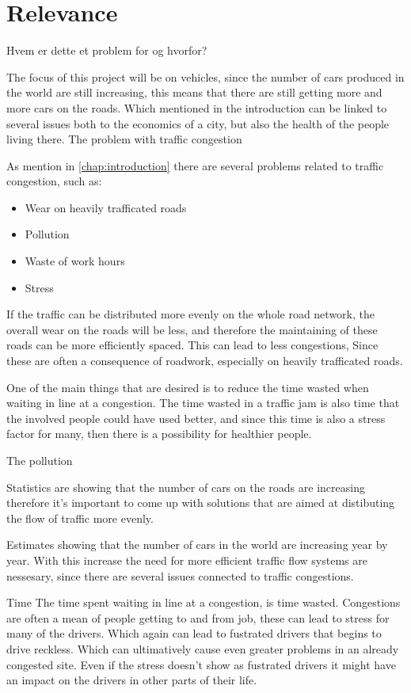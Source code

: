 \section{Relevance}
Hvem er dette et problem for og hvorfor?

The focus of this project will be on vehicles, since the number of cars produced in the world are still increasing, this means that there are still getting more and more cars on the roads. Which mentioned in the introduction can be linked to several issues both to the economics of a city, but also the health of the people living there.
The problem with traffic congestion 

As mention in \ref{chap:introduction} there are several problems related to traffic congestion, such as:
\begin{itemize}
	\item Wear on heavily trafficated roads
	\item Pollution
	\item Waste of work hours
	\item Stress
\end{itemize}

If the traffic can be distributed more evenly on the whole road network, the overall wear on the roads will be less, and therefore the maintaining of these roads can be more efficiently spaced. This can lead to less congestions, Since these are often a consequence of roadwork, especially on heavily trafficated roads.

One of the main things that are desired is to reduce the time wasted when waiting in line at a congestion.
The time wasted in a traffic jam is also time that the involved people could have used better, and since this time is also a stress factor for many, then there is a possibility for healthier people. 

The pollution 




Statistics are showing that the number of cars on the roads are increasing therefore it's important to come up with solutions that are aimed at distibuting the flow of traffic more evenly.

Estimates showing that the number of cars in the world are increasing year by year.\cite{http://wardsauto.com/ar/world_vehicle_population_110815} With this increase the need for more efficient traffic flow systems are nessesary, since there are several issues connected to traffic congestions.

Time
The time spent waiting in line at a congestion, is time wasted. Congestions are often a mean of people getting to and from job, these can lead to stress for many of the drivers.\cite{stress,http://psycnet.apa.org/journals/apl/63/4/467.pdf} Which again can lead to fustrated drivers that begins to drive reckless.\cite{http://www.sciencedirect.com/science/article/pii/S1369847899000029} Which can ultimatively cause even greater problems in an already congested site. Even if the stress doesn't show as fustrated drivers it might have an impact on the drivers in other parts of their life.
